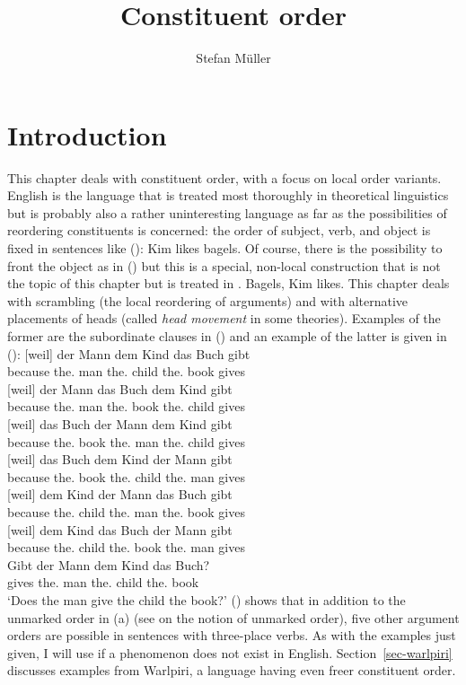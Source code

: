 \documentclass[output=paper]{langsci/langscibook}
\author{%
	Stefan Müller\affiliation{Humboldt-Universität zu Berlin}%
}
\title{Constituent order}
\begin{document}
\label{chap-order}

\section{Introduction} 

This chapter deals with constituent order, with a focus on local order variants. English is the
language that is treated most thoroughly in theoretical linguistics but is probably also a rather uninteresting
language as far as the possibilities of reordering constituents is concerned: the order of subject,
verb, and object is fixed in sentences like ():
\ea
Kim likes bagels.
\z
Of course, there is the possibility to front the object as in () but this is a special,
non-local construction that is not the topic of this chapter but is treated in .
\ea
Bagels, Kim likes.
\z
This chapter deals with scrambling (the local reordering of arguments) and with alternative
placements of heads (called \emph{head movement} in some theories). Examples of the former are the
subordinate clauses in () and an example of the latter is given in ():
\eal
\label{ex-permutation-mf}
\ex 
\gll {}[weil]          der Mann dem Kind das Buch gibt\\
     \spacebr{}because the.\NOM{} man the.\DAT{} child the.\ACC{} book gives\\
\ex 
\gll {}[weil]          der Mann das Buch dem Kind  gibt\\
     \spacebr{}because the.\NOM{} man  the.\ACC{} book the.\DAT{} child gives\\
\ex 
\gll {}[weil]          das Buch der Mann dem Kind  gibt\\
     \spacebr{}because the.\ACC{} book the.\NOM{} man  the.\DAT{} child gives\\
\ex 
\gll {}[weil]          das Buch dem Kind  der Mann gibt\\
     \spacebr{}because the.\ACC{} book the.\DAT{} child the.\NOM{} man  gives\\
\ex 
\gll {}[weil]          dem Kind  der Mann das Buch gibt\\
     \spacebr{}because the.\DAT{} child the.\NOM{} man  the.\ACC{} book gives\\
\ex 
\gll {}[weil]          dem Kind  das Buch der Mann gibt\\
     \spacebr{}because the.\DAT{} child the.\ACC{} book the.\NOM{} man  gives\\
\zl
\ea
\gll Gibt der Mann dem Kind das Buch?\\
     gives the.\NOM{} man the.\DAT{} child the.\ACC{} book\\
\glt `Does the man give the child the book?'
\z
() shows that in addition to the unmarked order in (a) (see  on the
notion of unmarked order), five other argument orders are possible in sentences with three-place
verbs. As with the examples just given, I will use  if a phenomenon does not exist in
English. Section~\ref{sec-warlpiri} discusses examples from Warlpiri, a language having even freer constituent order.
\end{document}
